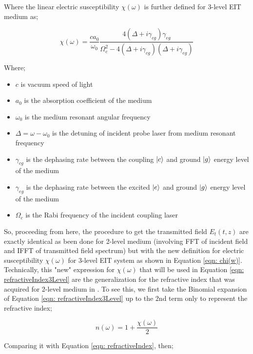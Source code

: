 Where the linear electric susceptibility $\chi(\omega)$ is further defined for 3-level EIT medium as;

\begin{equation}
    \chi(\omega) = \frac{ca_{0}}{\omega_{0}} \frac{4(\Delta + i\gamma_{cg})\gamma_{eg}}{\Omega_{c}^{2} - 4(\Delta + i\gamma_{cg})(\Delta + i\gamma_{eg})}
    \label{eqn: chi(w)}
\end{equation}

Where;

\begin{itemize}
    \item $c$ is vacuum speed of light
    \item $a_{0}$ is the absorption coefficient of the medium
    \item $\omega_{0}$ is the medium resonant angular frequency
    \item $\Delta = \omega - \omega_{0}$ is the detuning of incident probe laser from medium resonant frequency
    \item $\gamma_{cg}$ is the dephasing rate between the coupling $\ket{c}$ and ground $\ket{g}$ energy level of the medium
    \item $\gamma_{eg}$ is the dephasing rate between the excited $\ket{e}$ and ground $\ket{g}$ energy level of the medium
    \item $\Omega_{c}$ is the Rabi frequency of the incident coupling laser
\end{itemize}   

So, proceeding from here, the procedure to get the transmitted field $E_{t}(t, z)$ are exactly identical as been done for 2-level medium (involving FFT of incident field and IFFT of transmitted field spectrum) but with the new definition for electric susceptibility $\chi(\omega)$ for 3-level EIT system as shown in Equation \ref{eqn: chi(w)}.\\

Technically, this "new" expression for $\chi(\omega)$ that will be used in Equation \ref{eqn: refractiveIndex3Level} are the generalization for the refractive index that was acquired for 2-level medium in \cite{Kwong2017}. To see this, we first take the Binomial expansion of Equation \ref{eqn: refractiveIndex3Level} up to the 2nd term only to represent the refractive index;

\begin{equation}
    n(\omega) = 1 + \frac{\chi(\omega)}{2}
\end{equation}

Comparing it with Equation \ref{eqn: refractiveIndex}, then;

